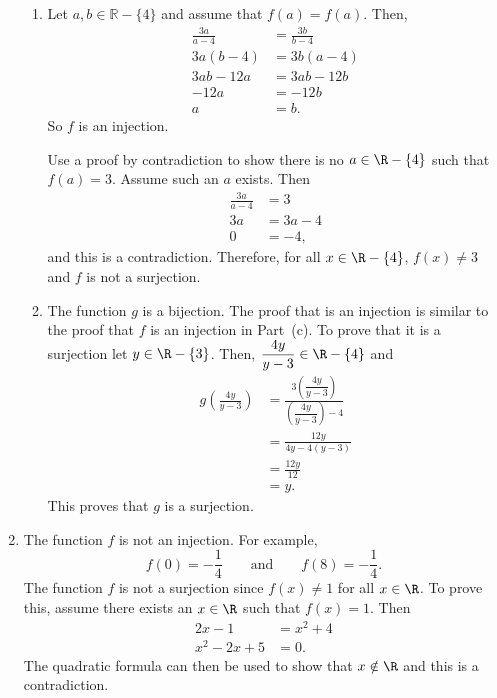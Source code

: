\begin{enumerate}
\begin{enumerate}
\item Let  $a, b \in \mathbb{R} - \{4 \}$ and assume that 
$f( a ) = f( a )$.  Then,
\begin{align*}
\frac{3a}{a - 4} &= \frac{3b}{b - 4} \\
       3a(b - 4) &= 3b(a - 4) \\
       3ab - 12a &= 3ab - 12b \\
            -12a &= -12b \\
               a &= b.
\end{align*}
So $f$ is an injection.

Use a proof by contradiction to show there is no $a \in \R - \{4 \}$ such that $f(a) = 3$.  Assume such an $a$ exists.  Then
\begin{align*}
\frac{3a}{a - 4} &= 3 \\
3a &= 3a - 4 \\
 0 &= - 4,
\end{align*}
and this is a contradiction.  Therefore, for all $x \in \R - \{4\}$, $f(x) \ne 3$ and $f$ is not a surjection.

\item The function $g$ is a bijection.  The proof that is an injection is similar to the proof that $f$ is an injection in Part~(c).  To prove that it is a surjection let 
$y \in \R - \{3 \}$.  Then, $\dfrac{4y}{y - 3} \in \R - \{4\}$ and
\begin{align*}
g \left(\frac{4y}{y - 3}\right) &= \frac{3 \left(\dfrac{4y}{y - 3}\right)}{\left(\dfrac{4y}{y - 3}\right) - 4} \\
   &= \frac{12y}{4y - 4(y - 3)} \\
   &= \frac{12y}{12} \\
   &= y.
\end{align*}
This proves that $g$ is a surjection.
\end{enumerate}



\item The function $f$ is not an injection.  For example,
\[
f(0) = -\frac{1}{4} \qquad \text{and} \qquad f (8) = -\frac{1}{4}.
\]
The function $f$ is not a surjection since $f(x) \ne 1$ for all $x \in \R$.  To prove this, assume there exists an $x \in \R$ such that $f(x) = 1$.  Then
\begin{align*}
2x - 1 &= x^2 + 4 \\
x^2 -2x + 5 &= 0.
\end{align*}
The quadratic formula can then be used to show that $x \notin \R$ and this is a contradiction.



\end{enumerate}
